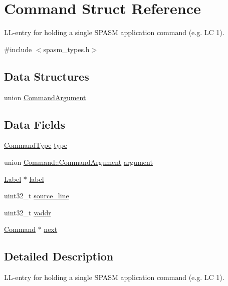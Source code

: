\hypertarget{struct_command}{
\section{\-Command \-Struct \-Reference}
\label{struct_command}
}


\-L\-L-\/entry for holding a single \-S\-P\-A\-S\-M application command (e.\-g. \-L\-C 1).  




{\ttfamily \#include $<$spasm\-\_\-types.\-h$>$}

\subsection*{\-Data \-Structures}
\begin{DoxyCompactItemize}
\item 
union \hyperlink{union_command_1_1_command_argument}{\-Command\-Argument}
\end{DoxyCompactItemize}
\subsection*{\-Data \-Fields}
\begin{DoxyCompactItemize}
\item 
\hyperlink{spasm__types_8h_a21e038f5b8958e203d28bc4f18472352}{\-Command\-Type} \hyperlink{struct_command_afd23b7e189739dbae6c0f2e93ba02c81}{type}
\item 
union \hyperlink{union_command_1_1_command_argument}{\-Command\-::\-Command\-Argument} \hyperlink{struct_command_aaccdf5b1e595a63e70012506fd31122c}{argument}
\item 
\hyperlink{struct_label}{\-Label} $\ast$ \hyperlink{struct_command_a928d3057e62c334c92ecc9aa9d90980b}{label}
\item 
uint32\-\_\-t \hyperlink{struct_command_a3e96525aafdcdfeb775c30f5f334efce}{source\-\_\-line}
\item 
uint32\-\_\-t \hyperlink{struct_command_aa969b498ef234bfdfcc3b98da28e12a3}{vaddr}
\item 
\hyperlink{struct_command}{\-Command} $\ast$ \hyperlink{struct_command_af9c9ea6f57adad15eb7af71d6834d0b4}{next}
\end{DoxyCompactItemize}


\subsection{\-Detailed \-Description}
\-L\-L-\/entry for holding a single \-S\-P\-A\-S\-M application command (e.\-g. \-L\-C 1). 

